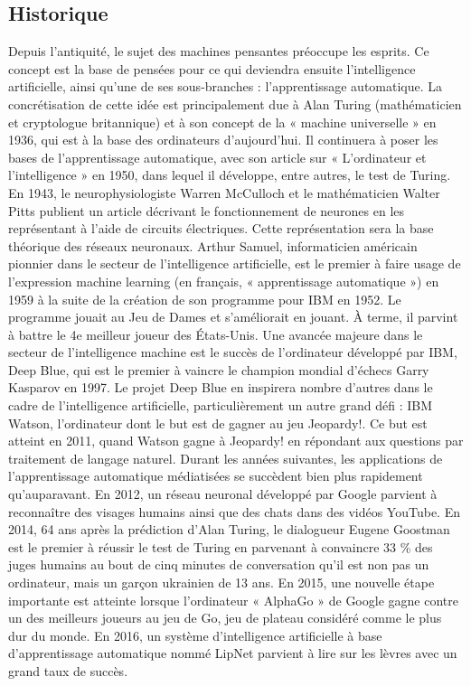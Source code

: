     \subsection{Historique}
        Depuis l'antiquité, le sujet des machines pensantes préoccupe les esprits. Ce concept est la base de pensées pour ce qui deviendra ensuite l'intelligence artificielle, ainsi qu'une de ses sous-branches : l'apprentissage automatique.
        La concrétisation de cette idée est principalement due à Alan Turing (mathématicien et cryptologue britannique) et à son concept de la « machine universelle » en 1936, qui est à la base des ordinateurs d'aujourd'hui. Il continuera à poser les bases de l'apprentissage automatique, avec son article sur « L'ordinateur et l'intelligence » en 1950, dans lequel il développe, entre autres, le test de Turing.
        En 1943, le neurophysiologiste Warren McCulloch et le mathématicien Walter Pitts publient un article décrivant le fonctionnement de neurones en les représentant à l'aide de circuits électriques. Cette représentation sera la base théorique des réseaux neuronaux.
        Arthur Samuel, informaticien américain pionnier dans le secteur de l'intelligence artificielle, est le premier à faire usage de l'expression machine learning (en français, « apprentissage automatique ») en 1959 à la suite de la création de son programme pour IBM en 1952. Le programme jouait au Jeu de Dames et s'améliorait en jouant. À terme, il parvint à battre le 4e meilleur joueur des États-Unis.
        Une avancée majeure dans le secteur de l'intelligence machine est le succès de l'ordinateur développé par IBM, Deep Blue, qui est le premier à vaincre le champion mondial d'échecs Garry Kasparov en 1997. Le projet Deep Blue en inspirera nombre d'autres dans le cadre de l'intelligence artificielle, particulièrement un autre grand défi : IBM Watson, l'ordinateur dont le but est de gagner au jeu Jeopardy!. Ce but est atteint en 2011, quand Watson gagne à Jeopardy! en répondant aux questions par traitement de langage naturel.
        Durant les années suivantes, les applications de l'apprentissage automatique médiatisées se succèdent bien plus rapidement qu'auparavant.
        En 2012, un réseau neuronal développé par Google parvient à reconnaître des visages humains ainsi que des chats dans des vidéos YouTube.
        En 2014, 64 ans après la prédiction d'Alan Turing, le dialogueur Eugene Goostman est le premier à réussir le test de Turing en parvenant à convaincre 33 \% des juges humains au bout de cinq minutes de conversation qu'il est non pas un ordinateur, mais un garçon ukrainien de 13 ans.
        En 2015, une nouvelle étape importante est atteinte lorsque l'ordinateur « AlphaGo » de Google gagne contre un des meilleurs joueurs au jeu de Go, jeu de plateau considéré comme le plus dur du monde.
        En 2016, un système d'intelligence artificielle à base d'apprentissage automatique nommé LipNet parvient à lire sur les lèvres avec un grand taux de succès.


